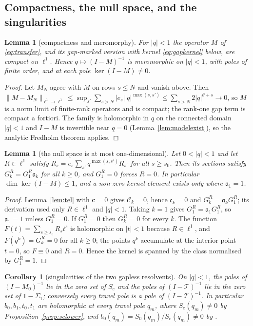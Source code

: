 \documentclass[11pt]{article}
\theoremstyle{plain}
\newtheorem{lemma}[theorem]{Lemma}
\newtheorem{corollary}[theorem]{Corollary}
\theoremstyle{definition}
\theoremstyle{remark}
\begin{document}
\subsection{Compactness, the null space, and the singularities}\label{sec:fred}

\begin{lemma}[compactness and meromorphy]\label{lem:fred}
For $|q|<1$ the operator $M$ of \eqref{eq:transfer}, and its gap-marked version with kernel
\eqref{eq:gapkernel} below, are compact on $\ell^1$. Hence $q\mapsto(I-M)^{-1}$ is meromorphic on
$|q|<1$, with poles of finite order, and at each pole $\ker(I-M)\ne0$.
\end{lemma}

\begin{proof}
Let $M_N$ agree with $M$ on rows $s\le N$ and vanish above. Then
$\|M-M_N\|_{\ell^1\to\ell^1}\le\sup_{s'}\sum_{s>N}|e_s||q|^{\max(s,s')}
\le\sum_{s>N}2|q|^{\vartheta+s}\to0$, so $M$ is a norm limit of finite-rank operators and is
compact; the rank-one gap term is compact a fortiori. The family is holomorphic in $q$ on the
connected domain $|q|<1$ and $I-M$ is invertible near $q=0$ (Lemma~\ref{lem:modelexist}), so the
analytic Fredholm theorem applies.
\end{proof}

\begin{lemma}[the null space is at most one-dimensional]\label{lem:nullspace}
Let $0<|q|<1$ and let $R\in\ell^1$ satisfy $R_s=e_s\sum_{s'}q^{\max(s,s')}R_{s'}$ for all
$s\ge s_0$. Then its sections satisfy $G^R_k=G^R_1\mathfrak a_k$ for all $k\ge0$, and $G^R_1=0$
forces $R=0$. In particular $\dim\ker(I-M)\le1$, and a non-zero kernel element exists only where
$\mathfrak a_1=1$.
\end{lemma}

\begin{proof}
Lemma~\ref{lem:tel} with $\mathbf c=0$ gives $\mathcal C_k=0$, hence $\mathfrak c_k=0$ and
$G^R_k=\mathfrak a_kG^R_1$; its derivation used only $R\in\ell^1$ and $|q|<1$. Taking $k=1$ gives
$G^R_1=\mathfrak a_1G^R_1$, so $\mathfrak a_1=1$ unless $G^R_1=0$. If $G^R_1=0$ then $G^R_k=0$ for
every $k$. The function $F(t)=\sum_{s\ge s_0}R_st^s$ is holomorphic on $|t|<1$ because
$R\in\ell^1$, and $F(q^k)=G^R_k=0$ for all $k\ge0$; the points $q^k$ accumulate at the interior
point $t=0$, so $F\equiv0$ and $R=0$. Hence the kernel is spanned by the class normalised by
$G^R_1=1$.
\end{proof}

\begin{corollary}[singularities of the two gapless resolvents]\label{cor:sing}
On $|q|<1$, the poles of $(I-M_0)^{-1}$ lie in the zero set of $S_e$ and the poles of
$(I-\mathcal T)^{-1}$ lie in the zero set of $1-\Sigma_1$; conversely every travel pole is a pole
of $(I-\mathcal T)^{-1}$.
In particular $b_0,b_1,t_0,t_1$ are holomorphic at every travel pole $q_m$, where $S_e(q_m)\ne0$
by Proposition~\ref{prop:selower}, and $b_0(q_m)=S_0(q_m)/S_e(q_m)\ne0$ by
{\cite[Proposition ``the numerators do not vanish at the travel poles'', \textup{prop:numnonvanish}]{Bonfioli2026bA}}.
\end{corollary}
\end{document}
